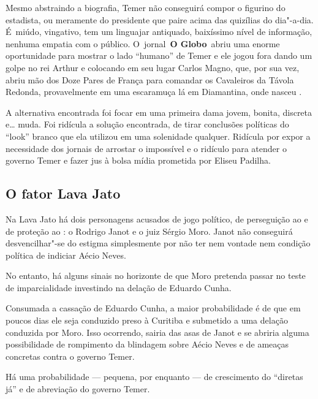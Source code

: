 Mesmo abstraindo a biografia, Temer não conseguirá compor o figurino do
estadista, ou meramente do presidente que paire acima das quizílias do
dia"-a-dia. É~miúdo, vingativo, tem um linguajar antiquado, baixíssimo
nível de informação, nenhuma empatia com o público. O~jornal~\textbf{O
Globo}~abriu uma enorme oportunidade para mostrar o lado ``humano'' de
Temer e ele jogou fora dando um golpe no rei Arthur e colocando em seu
lugar Carlos Magno, que, por sua vez, abriu mão dos Doze Pares de França
para comandar os Cavaleiros da Távola Redonda, provavelmente em uma
escaramuça lá em Diamantina, onde nasceu .

A alternativa encontrada foi focar em uma primeira dama jovem, bonita,
discreta e… muda. Foi ridícula a solução encontrada, de tirar
conclusões políticas do ``look'' branco que ela utilizou em uma
solenidade qualquer. Ridícula por expor a necessidade dos jornais de
arrostar o impossível e o ridículo para atender o governo Temer e fazer
jus à bolsa mídia prometida por Eliseu Padilha.

\subsection{\textbf{O fator Lava Jato}}

Na Lava Jato há dois personagens acusados de jogo político, de
perseguição ao  e de proteção ao : o  Rodrigo Janot e o juiz
Sérgio Moro. Janot não conseguirá desvencilhar"-se do estigma
simplesmente por não ter nem vontade nem condição política de indiciar
Aécio Neves.

No entanto, há alguns sinais no horizonte de que Moro pretenda passar no
teste de imparcialidade investindo na delação de Eduardo Cunha.

Consumada a cassação de Eduardo Cunha, a maior probabilidade é de que em
poucos dias ele seja conduzido preso à Curitiba e submetido a uma
delação conduzida por Moro. Isso ocorrendo, sairia das asas de Janot e
se abriria alguma possibilidade de rompimento da blindagem sobre Aécio
Neves e de ameaças concretas contra o governo Temer.

Há uma probabilidade --- pequena, por enquanto --- de crescimento do
``diretas já'' e de abreviação do governo Temer.
